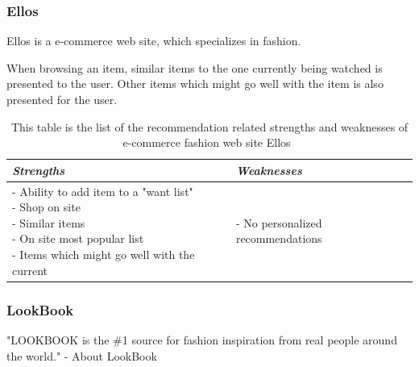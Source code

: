 \subsubsection{Ellos~\cite{Ellos}} %
\label{par:ellos}
    Ellos is a e-commerce web site, which specializes in fashion.

    When browsing an item, similar items to the one currently being watched is presented to the user.
    Other items which might go well with the item is also presented for the user.
    \begin{table}[H]
        \centering
        \begin{tabular}{l|l}
            \toprule
            \emph{Strengths} & \emph{Weaknesses} \\ \hline
            \pbox{9cm}{
                - Ability to add item to a "want list" \\
                - Shop on site \\
                - Similar items \\
                - On site most popular list \\
                - Items which might go well with the current
            } & \pbox{9cm}{
                - No personalized recommendations \\
            } \\ \bottomrule
        \end{tabular}
        \caption[Recommendation related strengths and weaknesses of Ellos~\cite{Ellos}]{This table is the list of the recommendation related strengths and weaknesses of e-commerce fashion web site Ellos~\cite{Ellos}}
        \label{table:ecommenreceEllos}
    \end{table}

\subsubsection{LookBook} %
\label{par:lookbook}
    "LOOKBOOK is the \#1 source for fashion inspiration from real people around the world." - About LookBook~\cite{LookBook}

